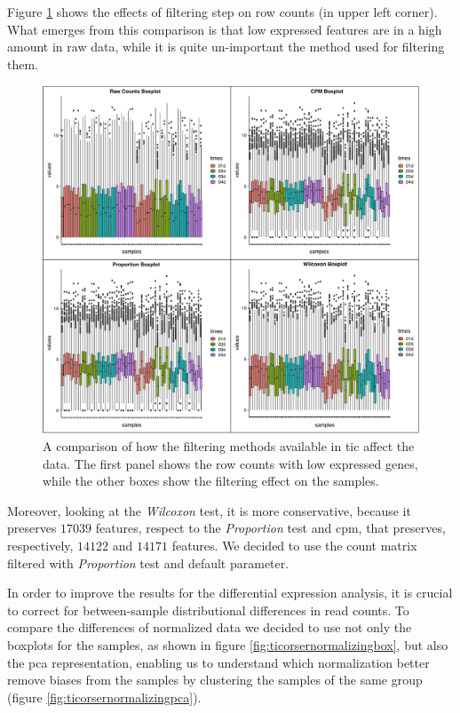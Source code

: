 Figure \ref{fig:ticorserfiltering} shows the effects of filtering step on row counts (in upper left corner). 
What emerges from this comparison is that low expressed features are in a high amount in raw data, while it is quite un-important the method used for filtering them.

\begin{figure}[H]
\centering
\includegraphics[width=12cm, keepaspectratio]{img/ticorser/filtering/panel1.pdf}
\caption[ticorser filtering methods]{A comparison of how the filtering methods available in \gls{tic} affect the data.
The first panel shows the row counts with low expressed genes, while the other boxes show the filtering effect on the samples.}
\label{fig:ticorserfiltering}

\end{figure}

Moreover, looking at the \textit{Wilcoxon} test, it is more conservative, because it preserves $17039$ features, respect to the \textit{Proportion} test and \gls{cpm}, that preserves, respectively, $14122$ and $14171$ features.
We decided to use the count matrix filtered with \textit{Proportion} test and default parameter.  

In order to improve the results for the differential expression analysis, it is crucial to correct for between-sample distributional differences in read counts.
To compare the differences of normalized data we decided to use not only the boxplots for the samples, as shown in  figure \ref{fig:ticorsernormalizingbox}, but also the \gls{pca} representation, enabling us to understand which normalization better remove biases from the samples by clustering the samples of the same group (figure \ref{fig:ticorsernormalizingpca}).

